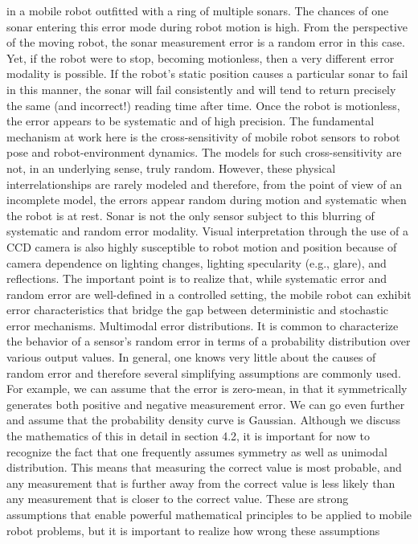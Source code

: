 in a mobile robot outfitted with a ring of multiple sonars. The chances of one sonar entering
this error mode during robot motion is high. From the perspective of the moving robot, the
sonar measurement error is a random error in this case. Yet, if the robot were to stop,
becoming motionless, then a very different error modality is possible. If the robot’s static
position causes a particular sonar to fail in this manner, the sonar will fail consistently and
will tend to return precisely the same (and incorrect!) reading time after time. Once the
robot is motionless, the error appears to be systematic and of high precision.
The fundamental mechanism at work here is the cross-sensitivity of mobile robot sensors to robot
pose and robot-environment dynamics. The models for such cross-sensitivity
are not, in an underlying sense, truly random. However, these physical interrelationships
are rarely modeled and therefore, from the point of view of an incomplete model, the errors
appear random during motion and systematic when the robot is at rest.
Sonar is not the only sensor subject to this blurring of systematic and random error
modality. Visual interpretation through the use of a CCD camera is also highly susceptible
to robot motion and position because of camera dependence on lighting changes, lighting
specularity (e.g., glare), and reflections. The important point is to realize that, while 
systematic error and random error are well-defined in a controlled setting, the mobile robot can
exhibit error characteristics that bridge the gap between deterministic and stochastic error
mechanisms.
Multimodal error distributions. It is common to characterize the behavior of a sensor’s
random error in terms of a probability distribution over various output values. In general,
one knows very little about the causes of random error and therefore several simplifying
assumptions are commonly used. For example, we can assume that the error is zero-mean,
in that it symmetrically generates both positive and negative measurement error. We can
go even further and assume that the probability density curve is Gaussian. Although we discuss 
the mathematics of this in detail in section 4.2, it is important for now to recognize the
fact that one frequently assumes symmetry as well as unimodal distribution. This means
that measuring the correct value is most probable, and any measurement that is further
away from the correct value is less likely than any measurement that is closer to the correct
value. These are strong assumptions that enable powerful mathematical principles to be
applied to mobile robot problems, but it is important to realize how wrong these assumptions 
